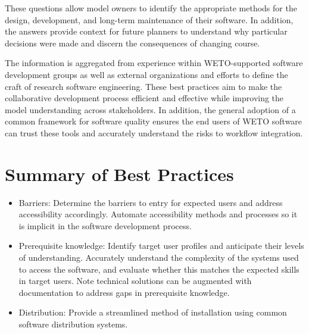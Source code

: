 \documentclass[]{nlr}
\begin{document}
These questions allow model owners to identify the appropriate methods for the design, development,
and long-term maintenance of their software. In addition, the answers provide context for future
planners to understand why particular decisions were made and discern the consequences of
changing course.

The information is aggregated from experience within WETO-supported software development
groups as well as external organizations and efforts to define the craft of research software
engineering. These best practices aim to make the collaborative development process efficient
and effective while improving the model understanding across stakeholders. In addition,
the general adoption of a common framework for software quality ensures the end users
of WETO software can trust these tools and accurately understand the risks to workflow integration.


\clearpage
\tableofcontents
\listoffigures

\mainmatter
\pagestyle{fancy}




\chapter{Summary of Best Practices}

\begin{itemize}
\item Barriers: Determine the barriers to entry for expected users and address accessibility accordingly.
Automate accessibility methods and processes so it is implicit in the software
development process.

\item Prerequisite knowledge: Identify target user profiles and anticipate their levels of understanding. Accurately understand the complexity of the systems used to access the software, and evaluate whether this matches the expected skills in target users. Note technical solutions can be augmented with documentation to address gaps in prerequisite knowledge.

\item Distribution: Provide a streamlined method of installation using common software distribution systems.
\end{itemize}
\end{document}
